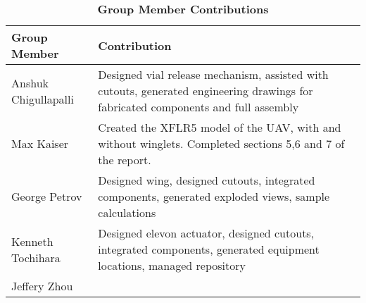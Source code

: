\begin{enumerate}[wide,label=\textbf{\arabic*}., labelindent=0pt]
    \begin{table}[H]
        \begin{center} 
        \caption{\textbf{Group Member Contributions}}
        \begin{tabular}{ | p{2in} | p{4in}| } 
            \hline
            \textbf{Group Member} & \textbf{Contribution} \\  \hline
            Anshuk Chigullapalli & Designed vial release mechanism, assisted with cutouts, generated engineering drawings for fabricated components and full assembly\\ \hline
            Max Kaiser & Created the XFLR5 model of the UAV, with and without winglets. Completed sections 5,6 and 7 of the report. \\ \hline
            George Petrov & Designed wing, designed cutouts, integrated components, generated exploded views, sample calculations \\ \hline
            Kenneth Tochihara & Designed elevon actuator, designed cutouts, integrated components, generated equipment locations, managed repository \\ \hline
            Jeffery Zhou & \\ \hline
        \end{tabular}
        \end{center}
    \end{table}
    
\end{enumerate}